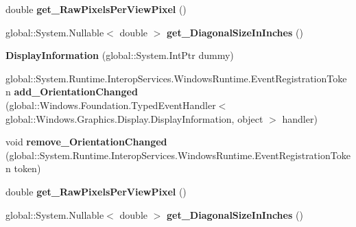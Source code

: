 \begin{DoxyCompactItemize}
double {\bfseries get\+\_\+\+Raw\+Pixels\+Per\+View\+Pixel} ()
\item 
\mbox{\label{class_windows_1_1_graphics_1_1_display_1_1_display_information_acf94f914fc79e6744c2000d54965e060}} 
global\+::\+System.\+Nullable$<$ double $>$ {\bfseries get\+\_\+\+Diagonal\+Size\+In\+Inches} ()
\item 
\mbox{\label{class_windows_1_1_graphics_1_1_display_1_1_display_information_a0cf7eebf1d214c165095e5dcf34c9b50}} 
{\bfseries Display\+Information} (global\+::\+System.\+Int\+Ptr dummy)
\item 
\mbox{\label{class_windows_1_1_graphics_1_1_display_1_1_display_information_ab25de6d82f535e3e82722b7b34a2e485}} 
global\+::\+System.\+Runtime.\+Interop\+Services.\+Windows\+Runtime.\+Event\+Registration\+Token {\bfseries add\+\_\+\+Orientation\+Changed} (global\+::\+Windows.\+Foundation.\+Typed\+Event\+Handler$<$ global\+::\+Windows.\+Graphics.\+Display.\+Display\+Information, object $>$ handler)
\item 
\mbox{\label{class_windows_1_1_graphics_1_1_display_1_1_display_information_a56bbdaab1ef2d9feb7c4b16d8d9f3a3a}} 
void {\bfseries remove\+\_\+\+Orientation\+Changed} (global\+::\+System.\+Runtime.\+Interop\+Services.\+Windows\+Runtime.\+Event\+Registration\+Token token)
\item 
\mbox{\label{class_windows_1_1_graphics_1_1_display_1_1_display_information_a9dc97c2bae189efb6b8e34a738397257}} 
double {\bfseries get\+\_\+\+Raw\+Pixels\+Per\+View\+Pixel} ()
\item 
\mbox{\label{class_windows_1_1_graphics_1_1_display_1_1_display_information_acf94f914fc79e6744c2000d54965e060}} 
global\+::\+System.\+Nullable$<$ double $>$ {\bfseries get\+\_\+\+Diagonal\+Size\+In\+Inches} ()
\item 
\mbox{\label{class_windows_1_1_graphics_1_1_display_1_1_display_information_a0cf7eebf1d214c165095e5dcf34c9b50}} 

\end{DoxyCompactItemize}
